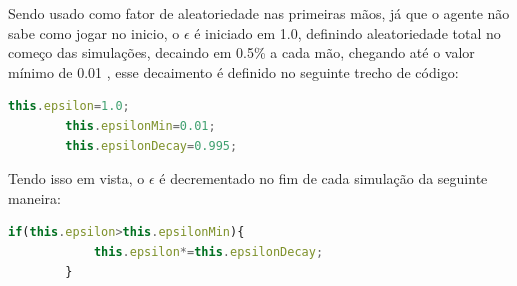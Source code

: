 Sendo usado como fator de aleatoriedade nas primeiras mãos, já que o agente não sabe como jogar no inicio, o $\epsilon$ é iniciado em 1.0, definindo aleatoriedade total no começo das simulações, decaindo em 0.5\% a cada mão, chegando até o valor mínimo de 0.01 , esse decaimento é definido no seguinte trecho de código:

\begin{lstlisting}[language=JavaScript, caption={Variáveis responsáveis pelo controle do epsilon}, label={cod:varEpsilom}]
        this.epsilon=1.0;
        this.epsilonMin=0.01;
        this.epsilonDecay=0.995;
\end{lstlisting}

Tendo isso em vista, o $\epsilon$ é decrementado no fim de cada simulação da seguinte maneira:

\begin{lstlisting}[language=JavaScript, caption={Decaimento do epsilon}, label={cod:decaEpsilom}]
        if(this.epsilon>this.epsilonMin){
            this.epsilon*=this.epsilonDecay;
        }
\end{lstlisting}
